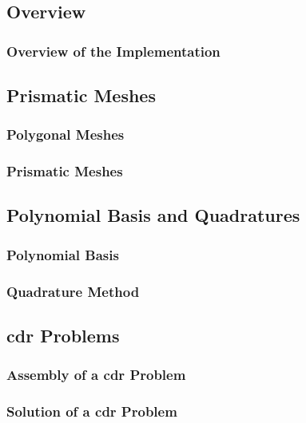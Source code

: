 \subsection{Overview}

\begin{frame}
    \frametitle{Overview of the Implementation}

    
\end{frame}

\subsection{Prismatic Meshes}

\begin{frame}
    \frametitle{Polygonal Meshes}

    
\end{frame}

\begin{frame}
    \frametitle{Prismatic Meshes}

    
\end{frame}

\subsection{Polynomial Basis and Quadratures}

\begin{frame}
    \frametitle{Polynomial Basis}

    
\end{frame}

\begin{frame}
    \frametitle{Quadrature Method}

    
\end{frame}

\subsection{\texorpdfstring{\acrshort{cdr}}{} Problems}

\begin{frame}
    \frametitle{Assembly of a \acrshort{cdr} Problem}

    
\end{frame}

\begin{frame}
    \frametitle{Solution of a \acrshort{cdr} Problem}

    
\end{frame}